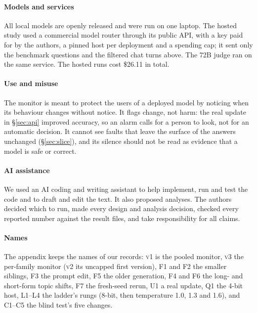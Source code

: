 \documentclass[11pt]{article}
\newcommand{\vone}{\textsc{v1}}
\newcommand{\vtwo}{\textsc{v2}}
\newcommand{\vthree}{\textsc{v3}}
\begin{document}
\paragraph{Models and services} All local models are openly released and were run
on one laptop. The hosted study used a commercial model router through its public
API, with a key paid for by the authors, a pinned host per deployment and a spending
cap; it sent only the benchmark questions and the filtered chat turns above. The
72B judge ran on the same service. The hosted runs cost \$26.11 in total.

\paragraph{Use and misuse} The monitor is meant to protect the users of a deployed
model by noticing when its behaviour changes without notice. It flags change, not
harm: the real update in \S\ref{sec:api} improved accuracy, so an alarm calls for
a person to look, not for an automatic decision. It cannot see faults that leave
the surface of the answers unchanged (\S\ref{sec:slice}), and its silence should not
be read as evidence that a model is safe or correct.

\paragraph{AI assistance} We used an AI coding and writing assistant to help
implement, run and test the code and to draft and edit the text. It also proposed
analyses. The authors decided which to run, made every design and analysis
decision, checked every reported number against the result files, and take
responsibility for all claims.



\appendix

\paragraph{Names} The appendix keeps the names of our records: \vone{} is the
pooled monitor, \vthree{} the per-family monitor (\vtwo{} its uncapped first
version), F1 and F2 the smaller siblings, F3 the prompt edit, F5 the older
generation, F4 and F6 the long- and short-form topic shifts, F7 the fresh-seed
rerun, U1 a real update, Q1 the 4-bit host, L1--L4 the ladder's rungs (8-bit, then
temperature 1.0, 1.3 and 1.6), and C1--C5 the blind test's five changes.
\end{document}
